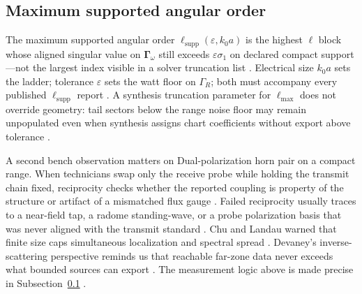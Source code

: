 \subsection{Maximum supported angular order}
\label{sec:ch461}
The maximum supported angular order $\ell_{\mathrm{supp}}(\varepsilon,k_0 a)$ is the highest $\ell$ block whose aligned singular value on $\boldsymbol{\Gamma}_\omega$ still exceeds $\varepsilon\sigma_{1}$ on declared compact support---not the largest index visible in a solver truncation list \cite{hansen1988}. Electrical size $k_0 a$ sets the ladder; tolerance $\varepsilon$ sets the watt floor on $\Gamma_R$; both must accompany every published $\ell_{\mathrm{supp}}$ report \cite{chu1948}. A synthesis truncation parameter for $\ell_{\max}$ does not override geometry: tail sectors below the range noise floor may remain unpopulated even when synthesis assigns chart coefficients without export above tolerance \cite{devaney2004}.
\begin{physicalvignette}
A second bench observation matters on Dual-polarization horn pair on a compact range. When technicians swap only the receive probe while holding the transmit chain fixed, reciprocity checks whether the reported coupling is property of the structure or artifact of a mismatched flux gauge \cite{stratton1941}. Failed reciprocity usually traces to a near-field tap, a radome standing-wave, or a probe polarization basis that was never aligned with the transmit standard \cite{hansen1988}.
Chu and Landau warned that finite size caps simultaneous localization and spectral spread \cite{chu1948}. Devaney's inverse-scattering perspective reminds us that reachable far-zone data never exceeds what bounded sources can export \cite{devaney2004}.
The measurement logic above is made precise in Subsection~\ref{sec:ch461} \cite{stratton1941}.
\end{physicalvignette}

